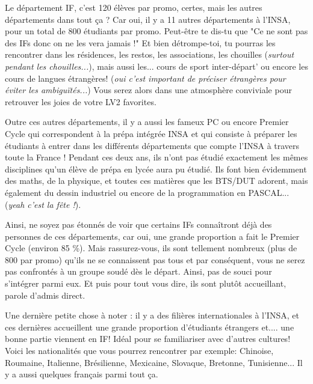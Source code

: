 Le département IF, c'est 120 élèves par promo, certes, mais les autres départements dans tout ça ?
Car oui, il y a 11 autres départements à l'INSA, pour un total de 800 étudiants par promo.
Peut-être te dis-tu que "Ce ne sont pas des IFs donc on ne les vera jamais !"
Et bien détrompe-toi, tu pourras les rencontrer dans les résidences, les restos,
les associations, les chouilles (\emph{surtout pendant les chouilles...}), mais
aussi les... cours de sport inter-départ' ou encore les cours de langues
étrangères! (\emph{oui c'est important de préciser étrangères pour éviter les
ambiguïtés...}) Vous serez alors dans une atmosphère conviviale pour
retrouver les joies de votre LV2 favorites.

Outre ces autres départements, il y a aussi les fameux PC ou encore Premier
Cycle qui correspondent à la prépa intégrée INSA et qui consiste à préparer les
étudiants à entrer dans les différents départements que compte l'INSA à travers
toute la France ! Pendant ces deux ans, ils n'ont pas étudié exactement les
mêmes disciplines qu'un élève de prépa en lycée aura pu étudié. Ils font bien
évidemment des maths, de la physique, et toutes ces matières que les BTS/DUT
adorent, mais également du dessin industriel ou encore de la programmation en
PASCAL... (\emph{yeah c'est la fête !}).


Ainsi, ne soyez pas étonnés de voir que certains IFs connaîtront déjà des
personnes de ces départements, car oui, une grande proportion a fait le Premier
Cycle (environ 85 \%). Mais rassurez-vous, ils sont tellement nombreux  (plus de
800 par promo) qu'ils ne se connaissent pas tous et par conséquent, vous
ne serez pas confrontés à un groupe soudé dès le départ. Ainsi, pas de souci
pour s'intégrer parmi eux. Et puis pour tout vous dire, ils sont plutôt
accueillant, parole d'admis direct.

Une dernière petite chose à noter : il y a des filières internationales à
l'INSA, et ces dernières accueillent une grande proportion d'étudiants étrangers
et.... une bonne partie viennent en IF! Idéal pour se familiariser avec d'autres
cultures! Voici les nationalités que vous pourrez rencontrer par exemple:
Chinoise, Roumaine, Italienne, Brésilienne, Mexicaine, Slovaque, Bretonne,
Tunisienne... Il y a aussi quelques français parmi tout ça.

